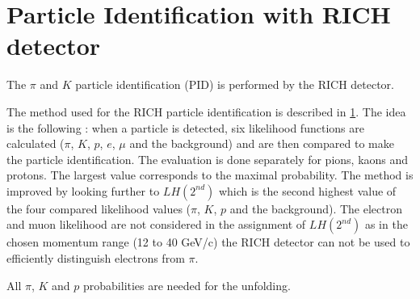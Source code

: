 
\section{Particle Identification with RICH detector}

The $\pi$ and $K$ particle identification (PID) is performed by the RICH detector.

The method used for the RICH particle identification is described in \ref{}. The idea is the following : when a particle
is detected, six likelihood functions are calculated ($\pi$, $K$, $p$, $e$, $\mu$ and the background) and are then
compared to make the particle identification. The evaluation is done separately for pions, kaons and protons. The largest
value corresponds to the maximal probability. The method is improved by looking further to $LH(2^{nd})$ which is the second
highest value of the four compared likelihood values ($\pi$, $K$, $p$ and the background). The electron and muon likelihood
are not considered in the assignment of $LH(2^{nd})$ as in the chosen momentum range (12 to 40 GeV/c) the RICH detector can
not be used to efficiently distinguish electrons from $\pi$.

All $\pi$, $K$ and $p$ probabilities are needed for the unfolding.


